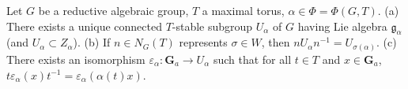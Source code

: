 Let $G$ be a reductive algebraic group, $T$ a maximal torus, $\alpha \in \Phi = \Phi(G, T)$.
(a) There exists a unique connected $T$-stable subgroup $U_{\alpha}$ of $G$ having Lie algebra $\mathfrak{g}_{\alpha}$ (and $U_{\alpha} \subset Z_{\alpha}$).
(b) If $n \in N_G(T)$ represents $\sigma \in W$, then $nU_{\alpha}n^{-1} = U_{\sigma(\alpha)}$.
(c) There exists an isomorphism $\varepsilon_{\alpha} : \mathbf{G}_a \rightarrow U_{\alpha}$ such that for all $t \in T$ and $x \in \mathbf{G}_a$, $t\varepsilon_{\alpha}(x)t^{-1} = \varepsilon_{\alpha}(\alpha(t)x)$.
